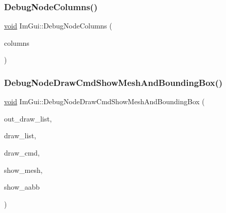 \mbox{\label{namespaceImGui_a68c10eb20be9c419d00f2b5a9dfa6a38}} 
\subsubsection{\texorpdfstring{Debug\+Node\+Columns()}{DebugNodeColumns()}}
{\footnotesize\ttfamily \hyperlink{imgui__impl__opengl3__loader_8h_ac668e7cffd9e2e9cfee428b9b2f34fa7}{void} Im\+Gui\+::\+Debug\+Node\+Columns (\begin{DoxyParamCaption}\item[{\hyperlink{structImGuiOldColumns}{Im\+Gui\+Old\+Columns} $\ast$}]{columns }\end{DoxyParamCaption})}

\mbox{\label{namespaceImGui_a24c6abd61c6da9610cbfbb46c0db828b}} 
\subsubsection{\texorpdfstring{Debug\+Node\+Draw\+Cmd\+Show\+Mesh\+And\+Bounding\+Box()}{DebugNodeDrawCmdShowMeshAndBoundingBox()}}
{\footnotesize\ttfamily \hyperlink{imgui__impl__opengl3__loader_8h_ac668e7cffd9e2e9cfee428b9b2f34fa7}{void} Im\+Gui\+::\+Debug\+Node\+Draw\+Cmd\+Show\+Mesh\+And\+Bounding\+Box (\begin{DoxyParamCaption}\item[{\hyperlink{structImDrawList}{Im\+Draw\+List} $\ast$}]{out\+\_\+draw\+\_\+list,  }\item[{const \hyperlink{structImDrawList}{Im\+Draw\+List} $\ast$}]{draw\+\_\+list,  }\item[{const \hyperlink{structImDrawCmd}{Im\+Draw\+Cmd} $\ast$}]{draw\+\_\+cmd,  }\item[{bool}]{show\+\_\+mesh,  }\item[{bool}]{show\+\_\+aabb }\end{DoxyParamCaption})}

\mbox{\label{namespaceImGui_a4fb68e2b5853124ce4d05f455fed0ad4}} 
